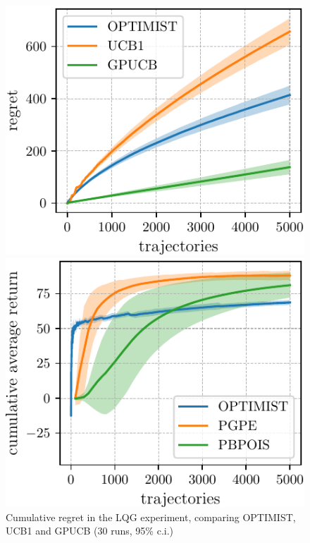 \documentclass{article}
\makeatletter
\DeclareRobustCommand{\algoname}{OPTIMIST\@\xspace}
\makeatother
\begin{document}
\begin{figure}[t] 
\vskip 0.2in
  \begin{minipage}[b]{0.24\linewidth}
    \centering
    \includegraphics[width=\linewidth]{plots/LQG_mu.pdf}
    \vspace{-0.4cm}
    \caption{Cumulative regret in the LQG experiment, comparing \algoname, UCB1 and GPUCB (30 runs, 95\% c.i.)} 
    \label{fig:lqg} 
  \end{minipage}%
  \hspace{0.3cm}
  \begin{minipage}[b]{0.24\linewidth}
    \centering
    \includegraphics[width=\linewidth]{plots/MC_mu.pdf}

\end{minipage}
\end{figure}
\end{document}
